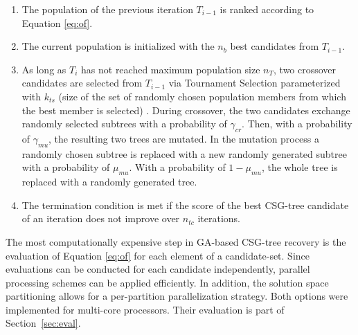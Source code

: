 \begin{enumerate}
\item The population of the previous iteration $T_{i-1}$ is ranked according to Equation \ref{eq:of}.
\item The current population is initialized with the $n_b$ best candidates from $T_{i-1}$.
\item As long as $T_i$ has not reached maximum population size $n_T$, two crossover candidates are selected from $T_{i-1}$ via Tournament Selection parameterized with $k_{ts}$ (size of the set of randomly chosen population members from which the best member is selected) \cite{miller95genetic}.
During crossover, the two candidates exchange randomly selected subtrees with a probability of $\gamma_{cr}$.
Then, with a probability of $\gamma_{mu}$, the resulting two trees are mutated. 
In the mutation process a randomly chosen subtree is replaced with a new randomly generated subtree with a probability of $\mu_{mu}$.
With a probability of $1-\mu_{mu}$, the whole tree is replaced with a randomly generated tree.
\item The termination condition is met if the score of the best \ac{CSG}-tree candidate of an iteration does not improve over $n_{tc}$ iterations.  	 
\end{enumerate}  
The most computationally expensive step in \ac{GA}-based \ac{CSG}-tree recovery is the evaluation of Equation \ref{eq:of} for each element of a candidate-set. 
Since evaluations can be conducted for each candidate independently, parallel processing schemes can be applied efficiently.  
In addition, the solution space partitioning allows for a per-partition parallelization strategy.
Both options were implemented for multi-core processors. Their evaluation is part of Section~\ref{sec:eval}.
